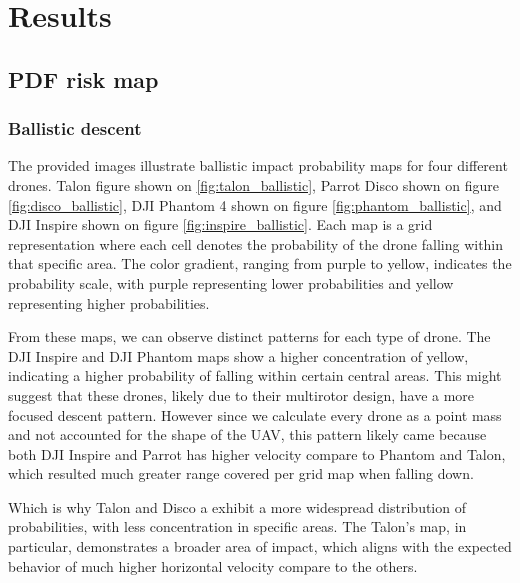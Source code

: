 \documentclass[12pt]{report}
\begin{document}
\chapter{Results}

    \section{PDF risk map}
        \subsection{Ballistic descent}
        The provided images illustrate ballistic impact probability maps for four different drones. Talon figure shown
        on \ref{fig:talon_ballistic}, Parrot Disco shown on figure \ref{fig:disco_ballistic}, DJI Phantom 4 shown on
        figure \ref{fig:phantom_ballistic}, and DJI Inspire shown on figure \ref{fig:inspire_ballistic}. Each map is a
        grid representation where each cell denotes the probability of the drone falling within that specific area. The
        color gradient, ranging from purple to yellow, indicates the probability scale, with purple representing lower
        probabilities and yellow representing higher probabilities.
            
        From these maps, we can observe distinct patterns for each type of drone. The DJI Inspire and DJI Phantom maps
        show a higher concentration of yellow, indicating a higher probability of falling within certain central areas.
        This might suggest that these drones, likely due to their multirotor design, have a more focused descent
        pattern. However since we calculate every drone as a point mass and not accounted for the shape of the UAV, this
        pattern likely came because both DJI Inspire and Parrot has higher velocity compare to Phantom and Talon, which
        resulted much greater range covered per grid map when falling down.
        
        Which is why Talon and Disco a exhibit a more widespread distribution of probabilities, with less concentration
        in specific areas. The Talon's map, in particular, demonstrates a broader area of impact, which aligns with the
        expected behavior of much higher horizontal velocity compare to the others.
\end{document}
